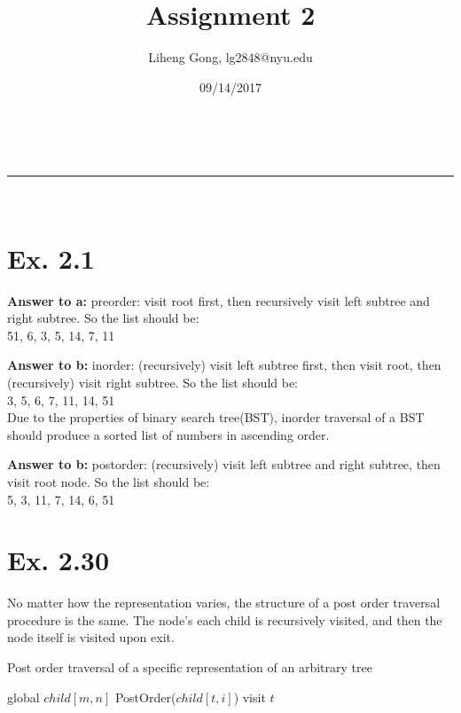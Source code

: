 \documentclass[a4paper,11pt]{article}
\makeatletter
\newcommand{\linia}{\rule{\linewidth}{0.5pt}}
\theoremstyle{mytheor}
\renewcommand{\maketitle}{
\begin{center}
\vspace{2ex}
{\huge \textsc{\@title}}
\vspace{1ex}
\\
\linia\\
\@author \hfill \@date
\vspace{4ex}
\end{center}
}
\makeatother
\begin{document}
\title{Assignment \textnumero{} 2}

\author{Liheng Gong, lg2848@nyu.edu}

\date{09/14/2017}

\maketitle

\section*{Ex. 2.1}
\noindent\textbf{Answer to a:} preorder: visit root first, then recursively visit left subtree and right subtree. So the list should be: \\51, 6, 3, 5, 14, 7, 11
\vspace{1.2in}


\noindent\textbf{Answer to b:} inorder: (recursively) visit left subtree first, then visit root, then (recursively) visit right subtree. So the list should be:\\ 3, 5, 6, 7, 11, 14, 51 \\Due to the properties of binary search tree(BST), inorder traversal of a BST should produce a sorted list of numbers in ascending order.
\vspace{1.2in}

\noindent\textbf{Answer to b:} postorder: (recursively) visit left subtree and right subtree, then visit root node. So the list should be: \\5, 3, 11, 7, 14, 6, 51

\vspace{1.2in}

\section*{Ex. 2.30}
No matter how the representation varies, the structure of a post order traversal procedure is the same. The node's each child is recursively visited, and then the node itself is visited upon exit.
\begin{algorithm}[H]
\caption{Post order traversal of a specific representation of an arbitrary tree}\label{POSTORDER_2_30}
\begin{algorithmic}[1]
\State global $child[m,n]$
 
   
    \State PostOrder($child[t, i]$) 
  \EndFor
  \State visit $t$ 
\EndProcedure
\end{algorithmic}
\end{algorithm}
\end{document}
